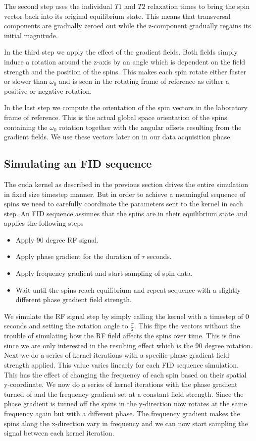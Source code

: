 The second step uses the individual $T1$ and $T2$ relaxation times to
bring the spin vector back into its original equilibrium state. This
means that transversal components are gradually zeroed out while the
z-component gradually regains its initial magnitude.

In the third step we apply the effect of the gradient fields. Both
fields simply induce a rotation around the z-axis by an angle which is
dependent on the field strength and the position of the spins. This
makes each spin rotate either faster or slower than $\omega_0$ and is
seen in the rotating frame of reference as either a positive or
negative rotation. 

In the last step we compute the orientation of the spin vectors in the
laboratory frame of reference. This is the actual global space
orientation of the spins containing the $\omega_0$ rotation together
with the angular offsets resulting from the gradient fields. We use
these vectors later on in our data acquisition phase.

\subsection{Simulating an FID sequence}

The cuda kernel as described in the previous section drives the entire
simulation in fixed size timestep manner. But in order to achieve a
meaningful sequence of spins we need to carefully coordinate the
parameters sent to the kernel in each step. An FID sequence assumes
that the spins are in their equilibrium state and applies the following steps
\begin{itemize}
\item Apply 90 degree RF signal.
\item Apply phase gradient for the duration of $\tau$ seconds.
\item Apply frequency gradient and start sampling of spin data.
\item Wait until the spins reach equilibrium and repeat sequence with
  a slightly different phase gradient field strength.
\end{itemize}
We simulate the RF signal step by simply calling the kernel with a
timestep of $0$ seconds and setting the rotation angle to
$\frac{\pi}{2}$. This flips the vectors without the trouble of
simulating how the RF field affects the spins over time. This is fine
since we are only interested in the resulting effect which is the 90
degree rotation. Next we do a series of kernel iterations with a
specific phase gradient field strength applied. This value varies
linearly for each FID sequence simulation. This has the effect of
changing the frequency of each spin based on their spatial
y-coordinate. We now do a series of kernel iterations with the phase
gradient turned of and the frequency gradient set at a constant field
strength. Since the phase gradient is turned off the spins in the
y-direction now rotates at the same frequency again but with a
different phase. The frequency gradient makes the spins along the
x-direction vary in frequency and we can now start sampling the signal
between each kernel iteration.

